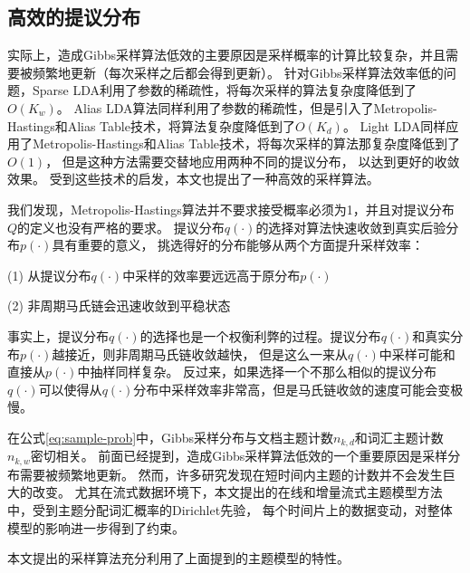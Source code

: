 \subsection{高效的提议分布}
实际上，造成Gibbs采样算法低效的主要原因是采样概率的计算比较复杂，并且需要被频繁地更新（每次采样之后都会得到更新）。
针对Gibbs采样算法效率低的问题，Sparse LDA利用了参数的稀疏性，将每次采样的算法复杂度降低到了$O(K_w)$。
Alias LDA算法同样利用了参数的稀疏性，但是引入了Metropolis-Hastings和Alias Table技术，将算法复杂度降低到了$O(K_d)$。
Light LDA同样应用了Metropolis-Hastings和Alias Table技术，将每次采样的算法那复杂度降低到了$O(1)$，
但是这种方法需要交替地应用两种不同的提议分布，
以达到更好的收敛效果。
受到这些技术的启发，本文也提出了一种高效的采样算法。

我们发现，Metropolis-Hastings算法并不要求接受概率必须为1，并且对提议分布$Q$的定义也没有严格的要求。
提议分布$q(\cdot)$的选择对算法快速收敛到真实后验分布$p(\cdot)$具有重要的意义，
挑选得好的分布能够从两个方面提升采样效率：

(1) 从提议分布$q(\cdot)$中采样的效率要远远高于原分布$p(\cdot)$

(2) 非周期马氏链会迅速收敛到平稳状态

事实上，提议分布$q(\cdot)$的选择也是一个权衡利弊的过程。提议分布$q(\cdot)$和真实分布$p(\cdot)$越接近，则非周期马氏链收敛越快，
但是这么一来从$q(\cdot)$中采样可能和直接从$p(\cdot)$中抽样同样复杂。
反过来，如果选择一个不那么相似的提议分布$q(\cdot)$可以使得从$q(\cdot)$分布中采样效率非常高，但是马氏链收敛的速度可能会变极慢。



在公式\ref{eq:sample-prob}中，Gibbs采样分布与文档主题计数$n_{k,d}$和词汇主题计数$n_{k,w}$密切相关。
前面已经提到，造成Gibbs采样算法低效的一个重要原因是采样分布需要被频繁地更新。
然而，许多研究发现在短时间内主题的计数并不会发生巨大的改变。
尤其在流式数据环境下，本文提出的在线和增量流式主题模型方法中，受到主题分配词汇概率的Dirichlet先验，
每个时间片上的数据变动，对整体模型的影响进一步得到了约束。

本文提出的采样算法充分利用了上面提到的主题模型的特性。

